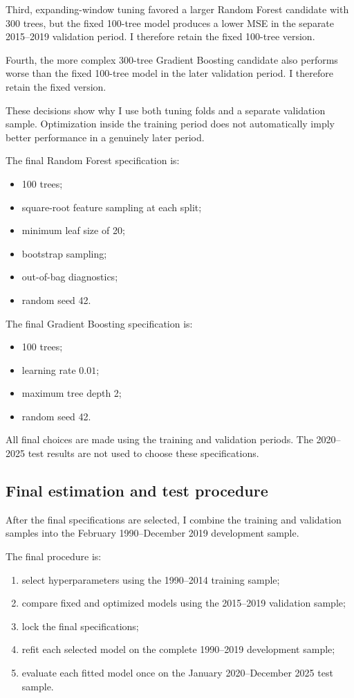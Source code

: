 \documentclass[11pt,a4paper]{article}
\begin{document}
Third, expanding-window tuning favored a larger Random Forest candidate with
300 trees, but the fixed 100-tree model produces a lower MSE in the separate
2015--2019 validation period. I therefore retain the fixed 100-tree version.

Fourth, the more complex 300-tree Gradient Boosting candidate also performs
worse than the fixed 100-tree model in the later validation period. I therefore
retain the fixed version.

These decisions show why I use both tuning folds and a separate validation
sample. Optimization inside the training period does not automatically imply
better performance in a genuinely later period.

The final Random Forest specification is:

\begin{itemize}
  \item 100 trees;
  \item square-root feature sampling at each split;
  \item minimum leaf size of 20;
  \item bootstrap sampling;
  \item out-of-bag diagnostics;
  \item random seed 42.
\end{itemize}

The final Gradient Boosting specification is:

\begin{itemize}
  \item 100 trees;
  \item learning rate \(0.01\);
  \item maximum tree depth 2;
  \item random seed 42.
\end{itemize}

All final choices are made using the training and validation periods. The
2020--2025 test results are not used to choose these specifications.

\subsection{Final estimation and test procedure}

After the final specifications are selected, I combine the training and
validation samples into the February 1990--December 2019 development sample.

The final procedure is:

\begin{enumerate}
  \item select hyperparameters using the 1990--2014 training sample;
  \item compare fixed and optimized models using the 2015--2019 validation
        sample;
  \item lock the final specifications;
  \item refit each selected model on the complete 1990--2019 development
        sample;
  \item evaluate each fitted model once on the January 2020--December 2025
        test sample.
\end{enumerate}
\end{document}
